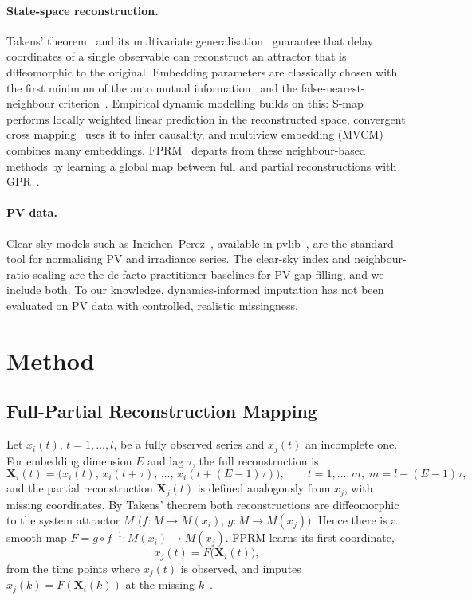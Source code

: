 \documentclass[11pt,a4paper]{article}
\begin{document}
\paragraph{State-space reconstruction.}
Takens' theorem~\cite{takens1981} and its multivariate generalisation~\cite{deyle2011} guarantee that delay coordinates of a single observable can reconstruct an attractor that is diffeomorphic to the original.
Embedding parameters are classically chosen with the first minimum of the auto mutual information~\cite{fraser1986} and the false-nearest-neighbour criterion~\cite{kennel1992}.
Empirical dynamic modelling builds on this: S-map~\cite{sugihara1994} performs locally weighted linear prediction in the reconstructed space, convergent cross mapping~\cite{sugihara2012} uses it to infer causality, and multiview embedding (MVCM)~\cite{ye2016} combines many embeddings.
FPRM~\cite{wu2026fprm} departs from these neighbour-based methods by learning a global map between full and partial reconstructions with GPR~\cite{rasmussen2006}.

\paragraph{PV data.}
Clear-sky models such as Ineichen--Perez~\cite{ineichen2002}, available in pvlib~\cite{holmgren2018pvlib}, are the standard tool for normalising PV and irradiance series.
The clear-sky index and neighbour-ratio scaling are the de facto practitioner baselines for PV gap filling, and we include both.
To our knowledge, dynamics-informed imputation has not been evaluated on PV data with controlled, realistic missingness.

\section{Method}\label{sec:method}

\subsection{Full-Partial Reconstruction Mapping}

Let $x_i(t)$, $t=1,\dots,l$, be a fully observed series and $x_j(t)$ an incomplete one.
For embedding dimension $E$ and lag $\tau$, the full reconstruction is
\begin{equation}
  \mathbf{X}_i(t) = \big(x_i(t),\,x_i(t+\tau),\,\dots,\,x_i(t+(E-1)\tau)\big),\qquad t = 1,\dots,m,\; m = l-(E-1)\tau ,
  \label{eq:full}
\end{equation}
and the partial reconstruction $\mathbf{X}_j(t)$ is defined analogously from $x_j$, with missing coordinates.
By Takens' theorem both reconstructions are diffeomorphic to the system attractor $M$ ($f:M\to M(x_i)$, $g:M\to M(x_j)$).
Hence there is a smooth map $F = g\circ f^{-1}: M(x_i)\to M(x_j)$.
FPRM learns its first coordinate,
\begin{equation}
  x_j(t) = F\big(\mathbf{X}_i(t)\big),
  \label{eq:map}
\end{equation}
from the time points where $x_j(t)$ is observed, and imputes $\hat x_j(k) = F(\mathbf{X}_i(k))$ at the missing $k$~\cite[Eqs.~11--14]{wu2026fprm}.
\end{document}
